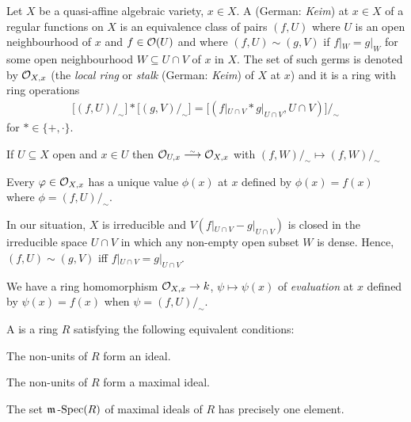\documentclass[a4paper,parskip=half,numbers=enddot, DIV=12]{scrreprt}
\begin{document}
	\begin{defi}
		Let $X$ be a quasi-affine algebraic variety, $x\in X$. A  (German: \emph{Keim}) at $x\in X$ of a regular functions on $X$ is an equivalence class of pairs $(f,U)$ where $U$ is an open neighbourhood of $x$ and $f\in\mathcal{O}(U)$ and where $(f,U)\sim (g,V)$ if $f|_W = g|_W$ for some open neighbourhood $W\subseteq U\cap V$ of $x$ in $X$. The set of such germs is denoted by $\mathcal{O}_{X,x}$ (the \emph{local ring} or \emph{stalk} (German: \emph{Keim}) of $X$ at $x$) and it is a ring with ring operations
		\begin{align*}
			\big[(f,U)/_\sim\big] * \big[(g,V)/_\sim\big] = \big[(f|_{U\cap V} * g|_{U\cap V}, U\cap V)\big]/_\sim
		\end{align*}
		for $*\in\{+,\cdot\}$.
	\end{defi}
	\begin{rem}
	\begin{alphanumerate}
	\item 
		If $U\subseteq X$ open and $x\in U$ then $\Oo_{U,x} \isomorphism \Oo_{X,x}$ with $(f,W)/_\sim \mapsto (f,W)/_\sim$
	\item 
		Every $\varphi\in \mathcal{O}_{X,x}$ has a unique value $\phi(x)$ at $x$ defined by $\phi(x) = f(x)$ where $\phi=(f,U)/_\sim$.
	\item 
		In our situation, $X$ is irreducible and $V(f|_{U\cap V} -g|_{U\cap V})$ is closed in the irreducible space $U\cap V$ in which any non-empty open subset $W$ is dense. Hence, $(f,U)\sim (g,V)$ iff $f|_{U\cap V} = g|_{U\cap V}$.
	\item 
		We have a ring homomorphism $\mathcal{O}_{X,x}\to k$, $\psi \mapsto \psi(x)$ of \emph{evaluation} at $x$ defined by $\psi (x) = f(x)$ when $\psi = (f,U)/_\sim$.
	\end{alphanumerate}
 
	\end{rem}
	\begin{defi}
		A  is a ring $R$ satisfying the following equivalent conditions:
		\begin{alphanumerate}
		\item 
			The non-units of $R$ form an ideal.
		\item 
			The non-units of $R$ form a maximal ideal.
		\item 
			The set $\mathfrak{m}\operatorname{-Spec}(R)$ of maximal ideals of $R$ has precisely one element.
		\end{alphanumerate}
	\end{defi}
\end{document}
